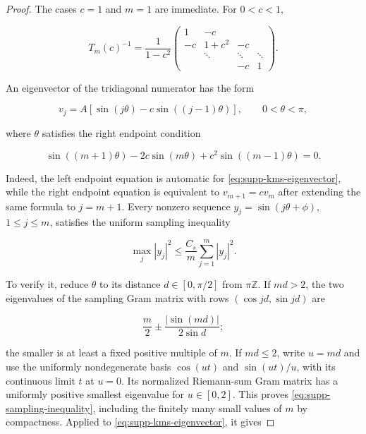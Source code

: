 \begin{proof}
The cases \(c=1\) and \(m=1\) are immediate.  For \(0<c<1\),

\begin{equation}\label{eq:supp-kms-inverse}
 T_m(c)^{-1}=\frac1{1-c^2}
 \begin{pmatrix}
 1&-c\\
 -c&1+c^2&-c\\
 &\ddots&\ddots&\ddots\\
 &&-c&1
 \end{pmatrix}.
\end{equation}

An eigenvector of the tridiagonal numerator has the form

\begin{equation}\label{eq:supp-kms-eigenvector}
 v_j=A[\sin(j\theta)-c\sin((j-1)\theta)],
 \qquad0<\theta<\pi,
\end{equation}

where \(\theta\) satisfies the right endpoint condition

\begin{equation}\label{eq:supp-kms-endpoint}
 \sin((m+1)\theta)-2c\sin(m\theta)
 +c^2\sin((m-1)\theta)=0.
\end{equation}

Indeed, the left endpoint equation is automatic for
\eqref{eq:supp-kms-eigenvector}, while the right endpoint equation is
equivalent to \(v_{m+1}=cv_m\) after extending the same formula to
\(j=m+1\). Every nonzero
sequence \(y_j=\sin(j\theta+\phi)\), \(1\le j\le m\), satisfies the uniform
sampling inequality

\begin{equation}\label{eq:supp-sampling-inequality}
 \max_j|y_j|^2\le\frac{C_s}{m}\sum_{j=1}^m|y_j|^2.
\end{equation}

To verify it, reduce \(\theta\) to its distance \(d\in[0,\pi/2]\) from
\(\pi\mathbb Z\).  If \(md>2\), the two eigenvalues of the sampling Gram
matrix with rows \((\cos jd,\sin jd)\) are

\[
 \frac m2\mathbin{\pm}\frac{|\sin(md)|}{2\sin d};
\]

the smaller is at least a fixed positive multiple of \(m\).  If \(md\le2\),
write \(u=md\) and use the uniformly nondegenerate basis
\(\cos(ut)\) and \(\sin(ut)/u\), with its continuous limit \(t\) at
\(u=0\).  Its normalized Riemann-sum Gram matrix has a uniformly positive
smallest eigenvalue for \(u\in[0,2]\).  This proves
\eqref{eq:supp-sampling-inequality}, including the finitely many small values
of \(m\) by compactness.  Applied to \eqref{eq:supp-kms-eigenvector}, it gives


\end{proof}

